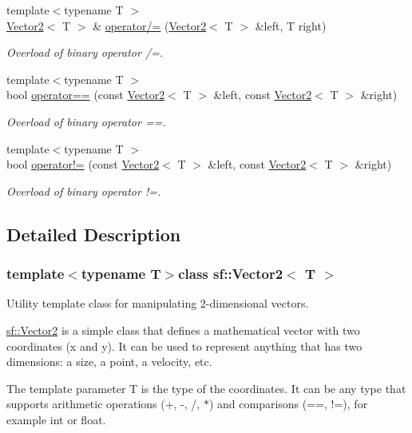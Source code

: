 \begin{DoxyCompactItemize}
{\footnotesize template$<$typename T $>$ }\\\hyperlink{classsf_1_1_vector2}{Vector2}$<$ T $>$ \& \hyperlink{classsf_1_1_vector2_ac4d293c9dc7954ccfd5e373972f38b03}{operator/=} (\hyperlink{classsf_1_1_vector2}{Vector2}$<$ T $>$ \&left, T right)
\begin{DoxyCompactList}\small\item\em Overload of binary operator /=. \end{DoxyCompactList}\item 
{\footnotesize template$<$typename T $>$ }\\bool \hyperlink{classsf_1_1_vector2_a9a7b2d36c3850828fdb651facfd25136}{operator==} (const \hyperlink{classsf_1_1_vector2}{Vector2}$<$ T $>$ \&left, const \hyperlink{classsf_1_1_vector2}{Vector2}$<$ T $>$ \&right)
\begin{DoxyCompactList}\small\item\em Overload of binary operator ==. \end{DoxyCompactList}\item 
{\footnotesize template$<$typename T $>$ }\\bool \hyperlink{classsf_1_1_vector2_a01673da35ef9c52d0e54b8263549a956}{operator!=} (const \hyperlink{classsf_1_1_vector2}{Vector2}$<$ T $>$ \&left, const \hyperlink{classsf_1_1_vector2}{Vector2}$<$ T $>$ \&right)
\begin{DoxyCompactList}\small\item\em Overload of binary operator !=. \end{DoxyCompactList}\end{DoxyCompactItemize}


\subsection{Detailed Description}
\subsubsection*{template$<$typename T$>$class sf\-::\-Vector2$<$ T $>$}

Utility template class for manipulating 2-\/dimensional vectors. 

\hyperlink{classsf_1_1_vector2}{sf\-::\-Vector2} is a simple class that defines a mathematical vector with two coordinates (x and y). It can be used to represent anything that has two dimensions\-: a size, a point, a velocity, etc.

The template parameter T is the type of the coordinates. It can be any type that supports arithmetic operations (+, -\/, /, $\ast$) and comparisons (==, !=), for example int or float.

